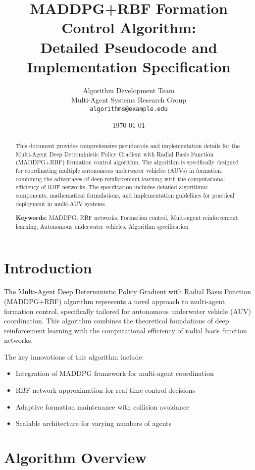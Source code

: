 \documentclass[11pt,a4paper]{article}
\title{\textbf{MADDPG+RBF Formation Control Algorithm: \\ Detailed Pseudocode and Implementation Specification}}
\author{
    Algorithm Development Team\\
    Multi-Agent Systems Research Group\\
    \texttt{algorithms@example.edu}
}
\date{\today}
\begin{document}
\maketitle

\begin{abstract}
This document provides comprehensive pseudocode and implementation details for the Multi-Agent Deep Deterministic Policy Gradient with Radial Basis Function (MADDPG+RBF) formation control algorithm. The algorithm is specifically designed for coordinating multiple autonomous underwater vehicles (AUVs) in formation, combining the advantages of deep reinforcement learning with the computational efficiency of RBF networks. The specification includes detailed algorithmic components, mathematical formulations, and implementation guidelines for practical deployment in multi-AUV systems.

\textbf{Keywords:} MADDPG, RBF networks, Formation control, Multi-agent reinforcement learning, Autonomous underwater vehicles, Algorithm specification
\end{abstract}

\tableofcontents
\newpage

\section{Introduction}

The Multi-Agent Deep Deterministic Policy Gradient with Radial Basis Function (MADDPG+RBF) algorithm represents a novel approach to multi-agent formation control, specifically tailored for autonomous underwater vehicle (AUV) coordination. This algorithm combines the theoretical foundations of deep reinforcement learning with the computational efficiency of radial basis function networks.

The key innovations of this algorithm include:
\begin{itemize}
    \item Integration of MADDPG framework for multi-agent coordination
    \item RBF network approximation for real-time control decisions
    \item Adaptive formation maintenance with collision avoidance
    \item Scalable architecture for varying numbers of agents
\end{itemize}

\section{Algorithm Overview}
\end{document}
